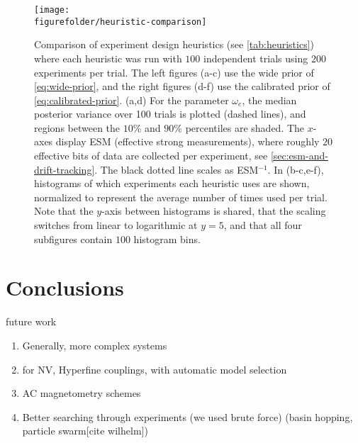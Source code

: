 \documentclass[aps,nofootinbib,twocolumn,superscriptaddress]{revtex4}
\newcommand{\figurefolder}{../fig}
\begin{document}
\begin{figure*}
    \centering
    \texttt{[image: \\figurefolder/heuristic-comparison]}
    \caption{Comparison of experiment design heuristics
    (see \autoref{tab:heuristics}) where each heuristic was run
    with $100$ independent trials using $200$ experiments per trial.
    The left figures (a-c) use the wide prior of \autoref{eq:wide-prior},
    and the right figures (d-f) use the calibrated prior of
    \autoref{eq:calibrated-prior}.
    (a,d) For the parameter $\omega_e$, the median posterior variance
    over 100 trials is plotted (dashed lines), and
    regions between the $10\%$ and $90\%$ percentiles are shaded.
    The $x$-axes display ESM (effective strong measurements), where
    roughly $20$ effective bits of data are collected per experiment,
    see \autoref{sec:esm-and-drift-tracking}.
    The black dotted line scales as ESM$^{-1}$.
    In (b-c,e-f), histograms of which experiments each heuristic uses are
    shown, normalized to represent the average number of times
    used per trial.
    Note that the $y$-axis between histograms is shared, that
    the scaling switches from linear to logarithmic at $y=5$, and
    that all four subfigures contain $100$ histogram bins.
    }
    \label{fig:heuristic-comparison}
\end{figure*}

\section{Conclusions}
\label{sec:conclusions}

future work
\begin{enumerate}
\item Generally, more complex systems
\item for NV, Hyperfine couplings, with automatic model selection
\item AC magnetometry schemes
\item Better searching through experiments (we used brute force)
(basin hopping, particle swarm[cite wilhelm])
\end{enumerate}




\end{document}
